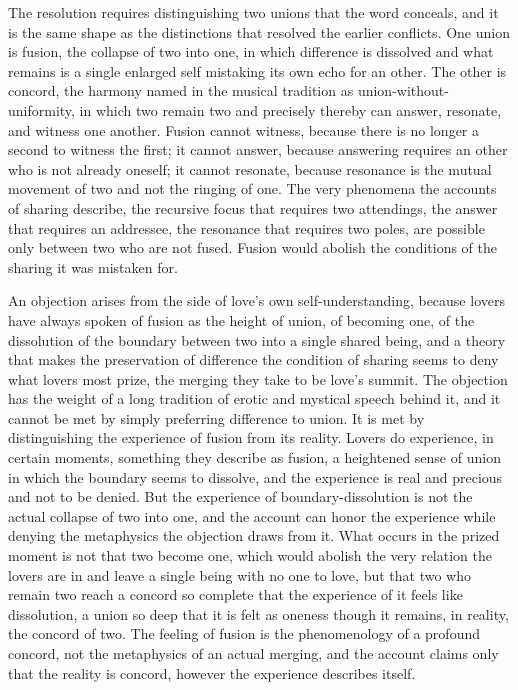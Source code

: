 The resolution requires distinguishing two unions that the word conceals, and it is the same shape as the distinctions that resolved the earlier conflicts. One union is fusion, the collapse of two into one, in which difference is dissolved and what remains is a single enlarged self mistaking its own echo for an other. The other is concord, the harmony named in the musical tradition as union-without-uniformity, in which two remain two and precisely thereby can answer, resonate, and witness one another. Fusion cannot witness, because there is no longer a second to witness the first; it cannot answer, because answering requires an other who is not already oneself; it cannot resonate, because resonance is the mutual movement of two and not the ringing of one. The very phenomena the accounts of sharing describe, the recursive focus that requires two attendings, the answer that requires an addressee, the resonance that requires two poles, are possible only between two who are not fused. Fusion would abolish the conditions of the sharing it was mistaken for.


An objection arises from the side of love's own self-understanding, because lovers have always spoken of fusion as the height of union, of becoming one, of the dissolution of the boundary between two into a single shared being, and a theory that makes the preservation of difference the condition of sharing seems to deny what lovers most prize, the merging they take to be love's summit. The objection has the weight of a long tradition of erotic and mystical speech behind it, and it cannot be met by simply preferring difference to union. It is met by distinguishing the experience of fusion from its reality. Lovers do experience, in certain moments, something they describe as fusion, a heightened sense of union in which the boundary seems to dissolve, and the experience is real and precious and not to be denied. But the experience of boundary-dissolution is not the actual collapse of two into one, and the account can honor the experience while denying the metaphysics the objection draws from it. What occurs in the prized moment is not that two become one, which would abolish the very relation the lovers are in and leave a single being with no one to love, but that two who remain two reach a concord so complete that the experience of it feels like dissolution, a union so deep that it is felt as oneness though it remains, in reality, the concord of two. The feeling of fusion is the phenomenology of a profound concord, not the metaphysics of an actual merging, and the account claims only that the reality is concord, however the experience describes itself.

